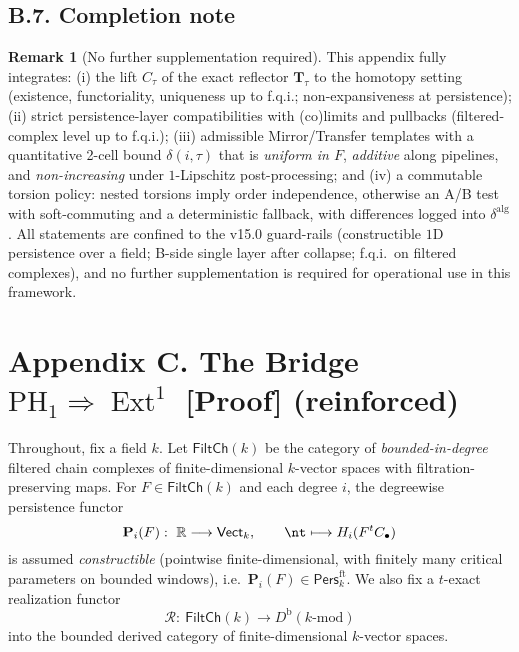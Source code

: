 \documentclass[11pt]{article}
\DeclareMathOperator{\Ext}{Ext}
\DeclareRobustCommand{\hyp}{\nobreakdash-}
\newcommand{\Pers}{\mathsf{Pers}}
\numberwithin{equation}{section}
\theoremstyle{definition}
\newtheorem{remark}[theorem]{Remark}
\begin{document}
\subsection*{B.7. Completion note}
\begin{remark}[No further supplementation required]
This appendix fully integrates: (i) the lift \(C_\tau\) of the exact reflector \(\mathbf{T}_\tau\) to the homotopy setting (existence, functoriality, uniqueness up to f.q.i.; non\hyp expansiveness at persistence); (ii) strict persistence\hyp layer compatibilities with (co)limits and pullbacks (filtered\hyp complex level up to f.q.i.); (iii) admissible Mirror/Transfer templates with a quantitative 2\hyp cell bound \(\delta(i,\tau)\) that is \emph{uniform in \(F\)}, \emph{additive} along pipelines, and \emph{non\hyp increasing} under \(1\)\hyp Lipschitz post\hyp processing; and (iv) a commutable torsion policy: nested torsions imply order independence, otherwise an A/B test with soft\hyp commuting and a deterministic fallback, with differences logged into \(\delta^{\mathrm{alg}}\).
All statements are confined to the v15.0 guard\hyp rails (constructible \(1\)D persistence over a field; B\hyp side single layer after collapse; f.q.i.\ on filtered complexes), and no further supplementation is required for operational use in this framework.
\end{remark}



\appendix
\section*{Appendix C. The Bridge \texorpdfstring{$\mathrm{PH}_1 \Rightarrow \Ext^1$}{PH1⇒Ext1} [Proof] (reinforced)}


Throughout, fix a field \(k\).
Let \(\mathsf{FiltCh}(k)\) be the category of \emph{bounded-in-degree} filtered chain complexes of finite-dimensional \(k\)-vector spaces with filtration-preserving maps.
For \(F\in\mathsf{FiltCh}(k)\) and each degree \(i\), the degreewise persistence functor
\[
\mathbf{P}_i(F):\ \mathbb{R}\longrightarrow \mathsf{Vect}_k,\qquad\nt\longmapsto H_i(F^{t}C_\bullet)
\]
is assumed \emph{constructible} (pointwise finite-dimensional, with finitely many critical parameters on bounded windows), i.e.\ \(\mathbf{P}_i(F)\in \Pers^{\mathrm{ft}}_k\).
We also fix a \(t\)-exact realization functor
\[
\mathcal{R}:\ \mathsf{FiltCh}(k)\longrightarrow D^{\mathrm{b}}(k\text{-mod})
\]
into the bounded derived category of finite-dimensional \(k\)-vector spaces.
\end{document}
